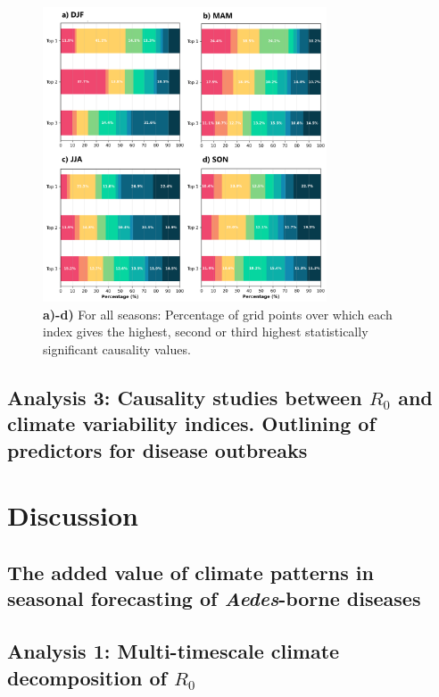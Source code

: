 \documentclass[10pt,twocolumn]{wlscirep}
\begin{document}
\begin{figure}[!ht]
  \centering
  \includegraphics[width=0.75\textwidth]{causality_barplots.png}
  \caption{\textbf{a)-d)} For all seasons: Percentage of grid points over which each index gives the highest, second or third highest statistically significant causality values.}
  \label{fig:panama-causality-barplots}
\end{figure}

\subsection{Analysis 3: Causality studies between $R_0$ and climate variability indices. Outlining of predictors for disease outbreaks} \label{sec-results-3}

\section{Discussion} \label{sec-discussion}

\subsection{The added value of climate patterns in seasonal forecasting of \textit{Aedes}-borne diseases} \label{sec-discussion-added-value}

\subsection{Analysis 1: Multi-timescale climate decomposition of $R_0$} \label{sec-discussion-analysis-1}
\end{document}
